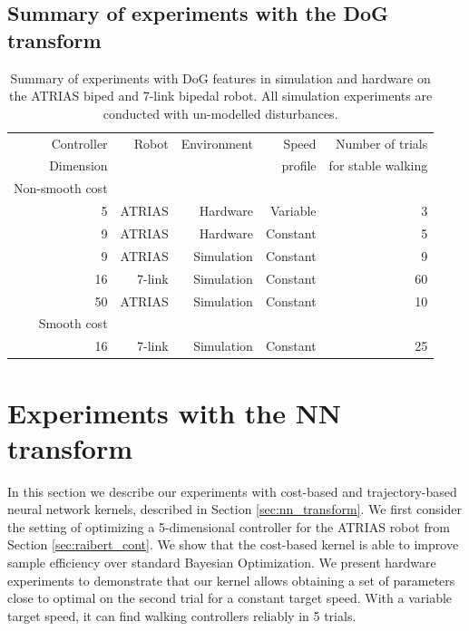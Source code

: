 
\subsection{Summary of experiments with the DoG transform}



\begin{table}[h!]
\centering
{}
\small{
\begin{tabular}{@{}rrrrr@{}} 
\toprule
Controller & Robot & Environment & Speed & Number of trials \\
Dimension & & & profile & for stable walking \\

\midrule

Non-smooth cost \\

5 & ATRIAS & Hardware & Variable & 3 \\

9 & ATRIAS & Hardware & Constant & 5 \\

9 & ATRIAS & Simulation & Constant & 9 \\

16 & 7-link & Simulation & Constant & 60 \\

50 & ATRIAS & Simulation & Constant & 10 \\

Smooth cost \\

16 & 7-link & Simulation & Constant & 25 \\

\bottomrule
\end{tabular}
}
\caption{Summary of experiments with DoG features in simulation and hardware on the ATRIAS biped and 7-link bipedal robot. All simulation experiments are conducted with un-modelled disturbances.}
\label{tbl:dog_expts_details}
\end{table}



\section{Experiments with the NN transform}

In this section we describe our experiments with cost-based and trajectory-based neural network kernels, described in Section \ref{sec:nn_transform}. We first consider the setting of optimizing a 5-dimensional controller for the ATRIAS robot from Section \ref{sec:raibert_cont}. We show that the cost-based kernel is able to improve sample efficiency over standard Bayesian Optimization. We present hardware experiments to demonstrate that our kernel allows obtaining a set of parameters close to optimal on the second trial for a constant target speed. With a variable target speed, it can find walking controllers reliably in 5 trials.

